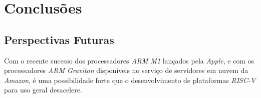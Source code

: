 \chapter{Conclusões}\label{cap_conclusoes}


\section{Perspectivas Futuras}

    { Com o recente sucesso dos processadores \textit{ARM M1} lançados pela
        \textit{Apple}, e com os processadores \textit{ARM Graviton} disponíveis
        no serviço de servidores em nuvem da \textit{Amazon}, é uma possibilidade
        forte que o desenvolvimento de plataformas \textit{RISC-V} para uso geral
        desacelere.
    }


